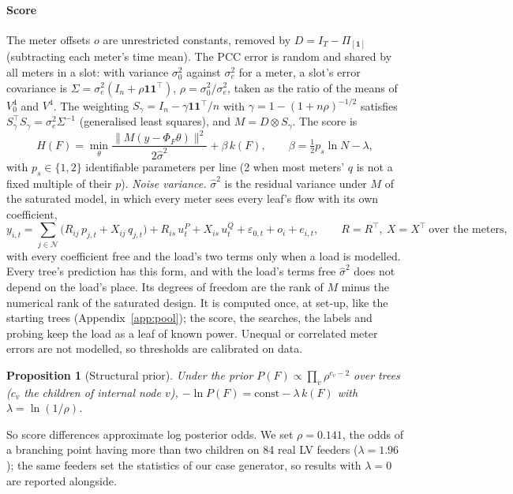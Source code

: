 \documentclass[journal,onecolumn,11pt]{IEEEtran}
\newtheorem{proposition}{Proposition}
\newcommand{\tp}{^{\top}}
\newcommand{\one}{\mathbf{1}}
\newcommand{\Nset}{\mathcal{N}}
\begin{document}
\paragraph*{Score} The meter offsets $o$ are unrestricted constants, removed by $D=I_T-\Pi_{[\one]}$ (subtracting each
meter's time mean). The PCC error is random and shared by all meters in a slot: with variance $\sigma_0^2$ against
$\sigma_e^2$ for a meter, a slot's error covariance is $\Sigma=\sigma_e^2(I_n+\rho\one\one\tp)$, $\rho=\sigma_0^2/\sigma_e^2$,
taken as the ratio of the means of $V_0^4$ and $V^4$. The weighting $S_\gamma=I_n-\gamma\one\one\tp/n$ with $\gamma=1-(1+n\rho)^{-1/2}$ satisfies
$S_\gamma\tp S_\gamma=\sigma_e^2\Sigma^{-1}$ (generalised least squares), and $M=D\otimes S_\gamma$. The score is
\begin{equation}\label{eq:score}
H(F)=\min_{\theta}\frac{\|M(y-\Phi_F\theta)\|^2}{2\hat\sigma^2}+\beta\,k(F),\qquad\beta=\tfrac12p_s\ln N-\lambda,
\end{equation}
with $p_s\in\{1,2\}$ identifiable parameters per line (2 when most meters' $q$ is not a fixed multiple of their $p$).
\emph{Noise variance.} $\hat\sigma^2$ is the residual variance under $M$ of the saturated model, in which every meter sees
every leaf's flow with its own coefficient,
\begin{equation}\label{eq:sat}
y_{i,t}=\sum_{j\in\Nset}\big(R_{ij}\,p_{j,t}+X_{ij}\,q_{j,t}\big)+R_{is}\,u^P_t+X_{is}\,u^Q_t+\varepsilon_{0,t}+o_i+e_{i,t},
\qquad R=R\tp,\ X=X\tp\ \text{over the meters},
\end{equation}
with every coefficient free and the load's two terms only when a load is modelled. Every tree's prediction has this form, and
with the load's terms free $\hat\sigma^2$ does not depend on the load's place. Its degrees of freedom are the rank of $M$ minus
the numerical rank of the saturated design. It is computed once, at set-up, like the starting trees
(Appendix~\ref{app:pool}); the score, the searches, the labels and probing keep the load as a leaf of known power. Unequal or
correlated meter errors are not modelled, so thresholds are calibrated on data.
\begin{proposition}[Structural prior]\label{prop:prior}
Under the prior $P(F)\propto\prod_v\rho^{c_v-2}$ over trees ($c_v$ the children of internal node $v$),
$-\ln P(F)=\mathrm{const}-\lambda\,k(F)$ with $\lambda=\ln(1/\rho)$.
\end{proposition}
So score differences approximate log posterior odds. We set $\rho=0.141$, the odds of a branching point having more than two
children on 84 real LV feeders ($\lambda=1.96$); the same feeders set the statistics of our case generator, so results with
$\lambda=0$ are reported alongside.
\end{document}
